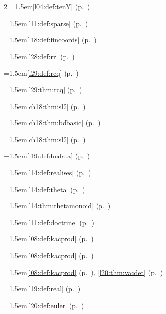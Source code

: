 \begin{multicols}{2}
\hangindent=1.5em\quad \ref{l04:def:tenY} (p.~\pageref{l04:def:tenY})\par
\hangindent=1.5em\quad \ref{l11:def:sparse} (p.~\pageref{l11:def:sparse})\par
\hangindent=1.5em\quad \ref{l18:def:fincoords} (p.~\pageref{l18:def:fincoords})\par
\hangindent=1.5em\quad \ref{l28:def:rr} (p.~\pageref{l28:def:rr})\par
\hangindent=1.5em\quad \ref{l29:def:rcq} (p.~\pageref{l29:def:rcq})\par
\hangindent=1.5em\quad \ref{l29:thm:rcq} (p.~\pageref{l29:thm:rcq})\par
\hangindent=1.5em\quad \ref{ch18:thm:sl2} (p.~\pageref{ch18:thm:sl2})\par
\hangindent=1.5em\quad \ref{ch18:thm:bdbasic} (p.~\pageref{ch18:thm:bdbasic})\par
\hangindent=1.5em\quad \ref{ch18:thm:sl2} (p.~\pageref{ch18:thm:sl2})\par
\hangindent=1.5em\quad \ref{l19:def:bcdata} (p.~\pageref{l19:def:bcdata})\par
\hangindent=1.5em\quad \ref{l14:def:realises} (p.~\pageref{l14:def:realises})\par
\hangindent=1.5em\quad \ref{l14:def:theta} (p.~\pageref{l14:def:theta})\par
\hangindent=1.5em\quad \ref{l14:thm:thetamonoid} (p.~\pageref{l14:thm:thetamonoid})\par
\hangindent=1.5em\quad \ref{l11:def:doctrine} (p.~\pageref{l11:def:doctrine})\par
\hangindent=1.5em\quad \ref{l08:def:kacprod} (p.~\pageref{l08:def:kacprod})\par
\hangindent=1.5em\quad \ref{l08:def:kacprod} (p.~\pageref{l08:def:kacprod})\par
\hangindent=1.5em\quad \ref{l08:def:kacprod} (p.~\pageref{l08:def:kacprod}), \ref{l20:thm:vacdet} (p.~\pageref{l20:thm:vacdet})\par
\hangindent=1.5em\quad \ref{l19:def:real} (p.~\pageref{l19:def:real})\par
\hangindent=1.5em\quad \ref{l20:def:euler} (p.~\pageref{l20:def:euler})\par

\end{multicols}

